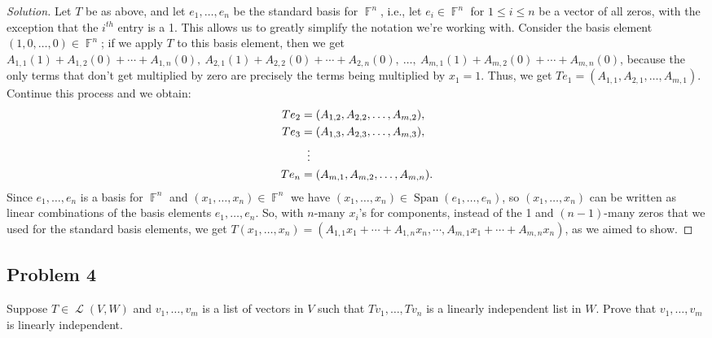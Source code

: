 \documentclass[letterpaper, 12pt]{amsart}
\DeclareMathOperator{\F}{\mathbb{F}}				%
\DeclareMathOperator{\Ell}{\mathscr{L}}				%
\DeclareMathOperator{\Span}{Span}					%
\theoremstyle{definition}  							%
\begin{document}
		\begin{proof}[Solution]
		Let $T$ be as above, and let $e_{1}, \dots, e_{n}$ be the standard basis for $\F^{n}$, i.e., let $e_{i} \in \F^{n}$ for $1 \leq i \leq n$ be a vector of all zeros, with the exception that the $i^{th}$ entry is a 1.
		This allows us to greatly simplify the notation we're working with.
		Consider the basis element $(1,0, \dots, 0) \in \F^{n}$; if we apply $T$ to this basis element, then  we get $A_{1,1} (1) + A_{1,2} (0) + \cdots + A_{1,n}(0), \ A_{2,1} (1) + A_{2,2} (0) + \cdots + A_{2,n}(0), \ \dots, \ A_{m,1} (1) + A_{m,2} (0) + \cdots + A_{m,n}(0)$, because the only terms that don't get multiplied by zero are precisely the terms being multiplied by $x_{1} = 1$.
		Thus, we get $Te_{1} = (A_{1,1}, A_{2,1}, \dots, A_{m,1})$.
		Continue this process and we obtain:
			\begin{align*}
				Te_{2} &= (A_{1,2}, A_{2,2}, \dots, A_{m,2}), \\
				Te_{3} &= (A_{1,3}, A_{2,3}, \dots, A_{m,3}), \\
				& \hspace{2mm} \vdots \\
				Te_{n} &= (A_{m,1}, A_{m,2}, \dots, A_{m,n}).
			\end{align*}
		Since $e_{1}, \dots, e_{n}$ is a basis for $\F^{n}$ and $(x_{1}, \dots, x_{n}) \in \F^{n}$ we have $(x_{1}, \dots, x_{n}) \in \Span(e_{1}, \dots, e_{n})$, so $(x_{1}, \dots, x_{n})$ can be written as linear combinations of the basis elements $e_{1}, \dots, e_{n}$.
		So, with $n$-many $x_{i}$'s for components, instead of the 1 and $(n-1)$-many zeros that we used for the standard basis elements, we get $T(x_{1}, \dots, x_{n}) = (A_{1,1} x_{1} + \cdots + A_{1,n}x_{n}, \cdots, A_{m,1}x_{1} + \cdots + A_{m,n}x_{n})$, as we aimed to show.
		\end{proof}

		\subsection*{Problem 4}
		Suppose $T \in \Ell(V,W)$ and $v_{1}, \dots, v_{m}$ is a list of vectors in $V$ such that $Tv_{1}, \dots, Tv_{n}$ is a linearly independent list in $W$.
		Prove that $v_{1}, \dots, v_{m}$ is linearly independent.
\end{document}
